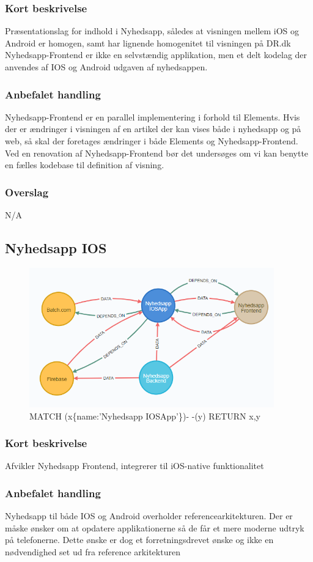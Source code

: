 \documentclass{article}
\begin{document}
\subsubsection{Kort beskrivelse}
Præsentationslag for indhold i Nyhedsapp, således at visningen mellem iOS og Android er homogen, samt har lignende homogenitet til visningen på DR.dk
Nyhedsapp-Frontend er ikke en selvstændig applikation, men et delt kodelag der anvendes af IOS og Android udgaven af nyhedsappen. 
\subsubsection{Anbefalet handling}
Nyhedsapp-Frontend er en parallel implementering i forhold til Elements. Hvis der er ændringer i visningen af en artikel der kan vises både i nyhedsapp og på web, så skal der foretages ændringer i både Elements og Nyhedsapp-Frontend. Ved en renovation af Nyhedsapp-Frontend bør det undersøges om vi kan benytte en fælles kodebase til definition af visning.
\subsubsection{Overslag}
N/A

\subsection{Nyhedsapp IOS}
\begin{figure}[h]
\includegraphics[width=300pt]{Nyhedsapp-IOS.PNG}
\caption{MATCH (x\{name:'Nyhedsapp IOSApp'\})- -(y) RETURN x,y}
\end{figure}
\subsubsection{Kort beskrivelse}
Afvikler Nyhedsapp Frontend, integrerer til iOS-native funktionalitet
\subsubsection{Anbefalet handling}
Nyhedsapp til både IOS og Android overholder referencearkitekturen. Der er måske ønsker om at opdatere applikationerne så de får et mere moderne udtryk på telefonerne. Dette ønske er dog et forretningsdrevet ønske og ikke en nødvendighed set ud fra reference arkitekturen
\end{document}
